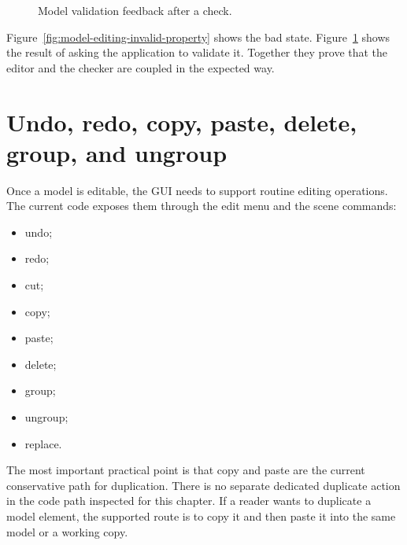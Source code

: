 \begin{figure}[htbp]
\centering
\caption{Model validation feedback after a check.}
\label{fig:model-editing-validation-message}
\end{figure}

Figure~\ref{fig:model-editing-invalid-property} shows the bad state. Figure~\ref{fig:model-editing-validation-message}
shows the result of asking the application to validate it. Together they prove that the editor and the
checker are coupled in the expected way.

\section{Undo, redo, copy, paste, delete, group, and ungroup}
\label{sec:model-editing-edit-operations}

Once a model is editable, the GUI needs to support routine editing operations. The current code exposes
them through the edit menu and the scene commands:
\begin{itemize}
\item undo;
\item redo;
\item cut;
\item copy;
\item paste;
\item delete;
\item group;
\item ungroup;
\item replace.
\end{itemize}

The most important practical point is that copy and paste are the current conservative path for
duplication. There is no separate dedicated duplicate action in the code path inspected for this chapter.
If a reader wants to duplicate a model element, the supported route is to copy it and then paste it into
the same model or a working copy.

